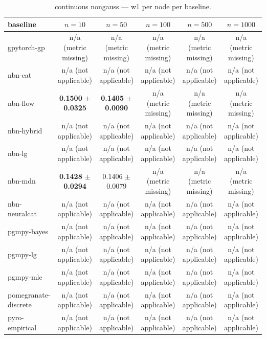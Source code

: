 \begin{table}[h]
\centering
\caption{continuous nongauss — w1 per node per baseline.}
\label{tab:continuous_nongauss_w1_per_node}
\begin{tabular}{lccccc}
\toprule
baseline & $n=10$ & $n=50$ & $n=100$ & $n=500$ & $n=1000$ \\
\midrule
gpytorch-gp & n/a (metric missing) & n/a (metric missing) & n/a (metric missing) & n/a (metric missing) & n/a (metric missing) \\
nbn-cat & n/a (not applicable) & n/a (not applicable) & n/a (not applicable) & n/a (not applicable) & n/a (not applicable) \\
nbn-flow & \textbf{0.1500 $\pm$ 0.0325} & \textbf{0.1405 $\pm$ 0.0090} & n/a (metric missing) & n/a (metric missing) & n/a (metric missing) \\
nbn-hybrid & n/a (not applicable) & n/a (not applicable) & n/a (not applicable) & n/a (not applicable) & n/a (not applicable) \\
nbn-lg & n/a (not applicable) & n/a (not applicable) & n/a (not applicable) & n/a (not applicable) & n/a (not applicable) \\
nbn-mdn & \textbf{0.1428 $\pm$ 0.0294} & 0.1406 $\pm$ 0.0079 & n/a (metric missing) & n/a (metric missing) & n/a (metric missing) \\
nbn-neuralcat & n/a (not applicable) & n/a (not applicable) & n/a (not applicable) & n/a (not applicable) & n/a (not applicable) \\
pgmpy-bayes & n/a (not applicable) & n/a (not applicable) & n/a (not applicable) & n/a (not applicable) & n/a (not applicable) \\
pgmpy-lg & n/a (not applicable) & n/a (not applicable) & n/a (not applicable) & n/a (not applicable) & n/a (not applicable) \\
pgmpy-mle & n/a (not applicable) & n/a (not applicable) & n/a (not applicable) & n/a (not applicable) & n/a (not applicable) \\
pomegranate-discrete & n/a (not applicable) & n/a (not applicable) & n/a (not applicable) & n/a (not applicable) & n/a (not applicable) \\
pyro-empirical & n/a (not applicable) & n/a (not applicable) & n/a (not applicable) & n/a (not applicable) & n/a (not applicable) \\
\bottomrule
\end{tabular}
\end{table}

